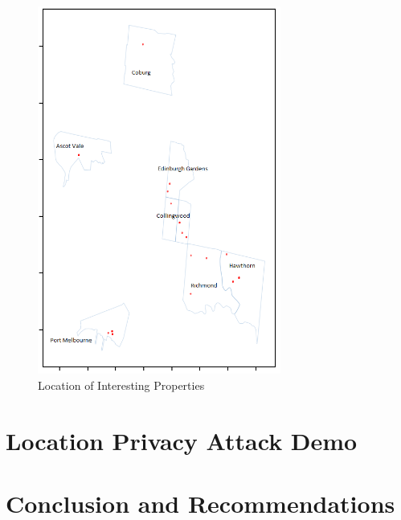 \documentclass[12pt]{report}
\theoremstyle{named}
\begin{document}
\begin{figure}[ht]
\centering
        \includegraphics[width=80mm,scale=1]{Images/FilteredInterestingProperties.png}
    \caption{Location of Interesting Properties}
    \label{fig:ExampleTimeLine}
\end{figure}

\chapter{Location Privacy Attack Demo }


\chapter{Conclusion and Recommendations}




\end{document}
